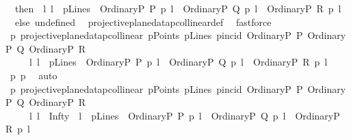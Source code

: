 \begin{isabellebody}
\ \ then\ {\isacharparenleft}{\kern0pt}{\isasymexists}\ l{\isachardot}{\kern0pt}\ l\ {\isasymin}\ pLines\ {\isasymand}\ {\isacharparenleft}{\kern0pt}OrdinaryP\ P{\isacharparenright}{\kern0pt}\ p{\isasymlhd}\ l\ {\isasymand}\ {\isacharparenleft}{\kern0pt}OrdinaryP\ Q{\isacharparenright}{\kern0pt}\ p{\isasymlhd}\ l\ {\isasymand}\ {\isacharparenleft}{\kern0pt}OrdinaryP\ R{\isacharparenright}{\kern0pt}\ p{\isasymlhd}\ l{\isacharparenright}{\kern0pt}\ \isanewline
\ \ else\ undefined{\isacharparenright}{\kern0pt}{\isachardoublequoteclose}\ \isamarkupfalse%
\ projective{\isacharunderscore}{\kern0pt}plane{\isacharunderscore}{\kern0pt}data{}{\isachardot}{\kern0pt}pcollinear{\isacharunderscore}{\kern0pt}def\ \isamarkupfalse%
\ fastforce\isanewline
\ \ \isamarkupfalse%
\ p{}{\isacharcolon}{\kern0pt}\ {\isachardoublequoteopen}{\isacharparenleft}{\kern0pt}projective{\isacharunderscore}{\kern0pt}plane{\isacharunderscore}{\kern0pt}data{}{\isachardot}{\kern0pt}pcollinear\ pPoints\ pLines\ pincid\ {\isacharparenleft}{\kern0pt}OrdinaryP\ P{\isacharparenright}{\kern0pt}\ {\isacharparenleft}{\kern0pt}OrdinaryP\ Q{\isacharparenright}{\kern0pt}\ {\isacharparenleft}{\kern0pt}OrdinaryP\ R{\isacharparenright}{\kern0pt}{\isacharparenright}{\kern0pt}\ {\isasymLongrightarrow}\ \isanewline
\ \ \ \ {\isasymexists}\ l{\isachardot}{\kern0pt}\ l\ {\isasymin}\ pLines\ {\isasymand}\ {\isacharparenleft}{\kern0pt}OrdinaryP\ P{\isacharparenright}{\kern0pt}\ p{\isasymlhd}\ l\ {\isasymand}\ {\isacharparenleft}{\kern0pt}OrdinaryP\ Q{\isacharparenright}{\kern0pt}\ p{\isasymlhd}\ l\ {\isasymand}\ {\isacharparenleft}{\kern0pt}OrdinaryP\ R{\isacharparenright}{\kern0pt}\ p{\isasymlhd}\ l{\isachardoublequoteclose}\ \isamarkupfalse%
\ p{}\ p{}\ \isamarkupfalse%
\ auto\isanewline
\ \ \isamarkupfalse%
\ p{}{\isacharcolon}{\kern0pt}\ {\isachardoublequoteopen}{\isacharparenleft}{\kern0pt}projective{\isacharunderscore}{\kern0pt}plane{\isacharunderscore}{\kern0pt}data{}{\isachardot}{\kern0pt}pcollinear\ pPoints\ pLines\ pincid\ {\isacharparenleft}{\kern0pt}OrdinaryP\ P{\isacharparenright}{\kern0pt}\ {\isacharparenleft}{\kern0pt}OrdinaryP\ Q{\isacharparenright}{\kern0pt}\ {\isacharparenleft}{\kern0pt}OrdinaryP\ R{\isacharparenright}{\kern0pt}{\isacharparenright}{\kern0pt}\ {\isasymLongrightarrow}\ \isanewline
\ \ \ \ {\isasymexists}\ l{\isachardot}{\kern0pt}\ l\ {\isasymnoteq}\ Infty\ {\isasymand}\ l\ {\isasymin}\ pLines\ {\isasymand}\ {\isacharparenleft}{\kern0pt}OrdinaryP\ P{\isacharparenright}{\kern0pt}\ p{\isasymlhd}\ l\ {\isasymand}\ {\isacharparenleft}{\kern0pt}OrdinaryP\ Q{\isacharparenright}{\kern0pt}\ p{\isasymlhd}\ l\ {\isasymand}\ {\isacharparenleft}{\kern0pt}OrdinaryP\ R{\isacharparenright}{\kern0pt}\ p{\isasymlhd}\ l{\isachardoublequoteclose}\ \isamarkupfalse%

\end{isabellebody}
